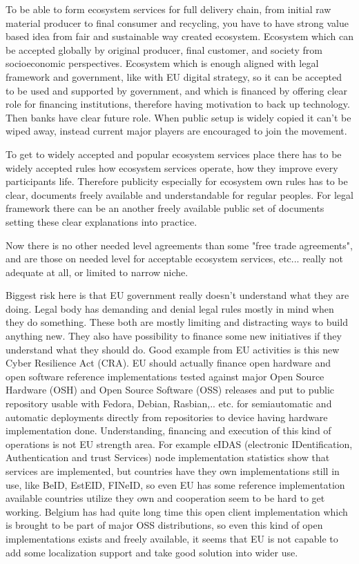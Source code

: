 To be able to form ecosystem services for full delivery chain, from initial raw material producer to final consumer and recycling, you have to have strong value based idea from fair and sustainable way created ecosystem. Ecosystem which can be accepted globally by original producer, final customer, and society from socioeconomic perspectives. Ecosystem which is enough aligned with legal framework and government, like with EU digital strategy, so it can be accepted to be used and supported by government, and which is financed by offering clear role for financing institutions, therefore having motivation to back up technology. Then banks have clear future role. When public setup is widely copied it can't be wiped away, instead current major players are encouraged to join the movement.

To get to widely accepted and popular ecosystem services place there has to be widely accepted rules how ecosystem services operate, how they improve every participants life. Therefore publicity especially for ecosystem own rules has to be clear, documents freely available and understandable for regular peoples. For legal framework there can be an another freely available public set of documents setting these clear explanations into practice.

Now there is no other needed level agreements than some "free trade agreements", and are those on needed level for acceptable ecosystem services, etc... really not adequate at all, or limited to narrow niche.

Biggest risk here is that EU government really doesn't understand what they are doing. Legal body has demanding and denial legal rules mostly in mind when they do something. These both are mostly limiting and distracting ways to build anything new. They also have possibility to finance some new initiatives if they understand what they should do. Good example from EU activities is this new Cyber Resilience Act (CRA)\cite{EU_CRA}. EU should actually finance open hardware and open software reference implementations tested against major Open Source Hardware (OSH) and Open Source Software (OSS) releases and put to public repository usable with Fedora, Debian, Rasbian,.. etc. for semiautomatic and automatic deployments directly from repositories to device having hardware implementation\cite{ISO_IEC_19790} done. Understanding, financing and execution of this kind of operations is not EU strength area. For example eIDAS (electronic IDentification, Authentication and trust Services) node implementation statistics \cite{eIDASnode} show that services are implemented, but countries have they own implementations still in use, like BeID, EstEID, FINeID, so even EU has some reference implementation available countries utilize they own and cooperation seem to be hard to get working. Belgium has had quite long time this open client implementation which is brought to be part of major OSS distributions, so even this kind of open implementations exists and freely available, it seems that EU is not capable to add some localization support and take good solution into wider use.

